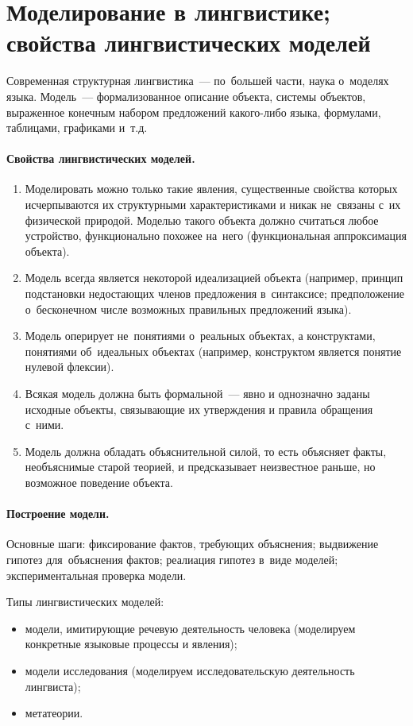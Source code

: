 \documentclass[12pt]{article}
\theoremstyle{definition}
\theoremstyle{remark}
\numberwithin{equation}{section}
\begin{document}
\section{Моделирование в лингвистике;  свойства лингвистических моделей}
Современная структурная лингвистика~--- по~большей части, наука
о~моделях языка. Модель~--- формализованное описание объекта,
системы объектов, выраженное конечным набором предложений какого-либо
языка, формулами, таблицами, графиками и~т.д.

\paragraph{Свойства лингвистических моделей.}
\begin{enumerate}
	\item Моделировать можно только такие явления, существенные
    свойства которых исчерпываются их структурными характеристиками
    и никак не~связаны с~их физической природой. Моделью такого объекта
    должно считаться любое устройство, функционально похожее на~него
    (функциональная аппроксимация объекта).
	\item Модель всегда является некоторой идеализацией объекта
    (например, принцип подстановки недостающих членов предложения
    в~синтаксисе; предположение о~бесконечном числе возможных правильных
    предложений языка).
	\item Модель оперирует не~понятиями о~реальных объектах, а конструктами,
    понятиями об~идеальных объектах (например, конструктом является
    понятие нулевой флексии).
	\item Всякая модель должна быть формальной~--- явно и однозначно
    заданы исходные объекты, связывающие их утверждения и правила
    обращения с~ними.
	\item Модель должна обладать объяснительной силой, то есть объясняет
    факты, необъяснимые старой теорией, и предсказывает неизвестное раньше,
    но возможное поведение объекта.
\end{enumerate}

\paragraph{Построение модели.}
Основные шаги: фиксирование фактов, требующих объяснения; выдвижение гипотез
для~объяснения фактов; реалиация гипотез в~виде моделей; экспериментальная
проверка модели.

Типы лингвистических моделей:
\begin{itemize}
	\item модели, имитирующие речевую деятельность человека (моделируем
    конкретные языковые процессы и явления);
	\item модели исследования (моделируем исследовательскую деятельность
    лингвиста);
	\item метатеории.
\end{itemize}
\end{document}
